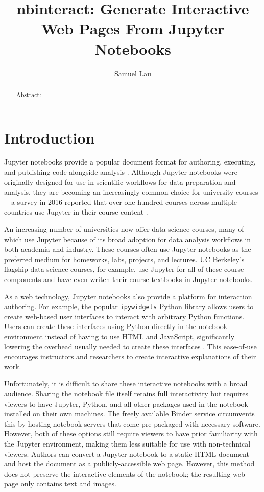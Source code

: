 \documentclass[nobib]{tufte-handout}
\title{nbinteract: Generate Interactive Web Pages From Jupyter Notebooks}
\author[Samuel Lau]{Samuel Lau}
\newcommand{\code}[1]{\texttt{#1}}
\begin{document}
\maketitle%

\begin{abstract}
\noindent
Abstract:
\end{abstract}

\section{Introduction} %
\label{sec:introduction}

Jupyter notebooks provide a popular document format for authoring, executing,
and publishing code alongside analysis \cite{thomas_jupyter_2016}. Although
Jupyter notebooks were originally designed for use in scientific workflows for
data preparation and analysis, they are becoming an increasingly common choice
for university courses---a survey in 2016 reported that over one hundred
courses across multiple countries use Jupyter in their course content
\cite{hamrick_2016_2016}.

An increasing number of universities now offer data science courses, many of
which use Jupyter because of its broad adoption for data analysis workflows in
both academia and industry. These courses often use Jupyter notebooks as the
preferred medium for homeworks, labs, projects, and lectures. UC Berkeley's
flagship data science courses, for example, use Jupyter for all of these course
components and have even writen their course textbooks in Jupyter notebooks.

As a web technology, Jupyter notebooks also provide a platform for interaction
authoring. For example, the popular \code{ipywidgets} Python library allows
users to create web-based user interfaces to interact with arbitrary Python
functions. Users can create these interfaces using Python directly in the
notebook environment instead of having to use HTML and JavaScript,
significantly lowering the overhead usually needed to create these interfaces
\cite{_jupyter-widgets/ipywidgets_}. This ease-of-use encourages instructors
and researchers to create interactive explanations of their work.

Unfortunately, it is difficult to share these interactive notebooks with a
broad audience. Sharing the notebook file itself retains full interactivity but
requires viewers to have Jupyter, Python, and all other packages used in the
notebook installed on their own machines. The freely available Binder service
circumvents this by hosting notebook servers that come pre-packaged with
necessary software. However, both of these options still require viewers to
have prior familiarity with the Jupyter environment, making them less suitable
for use with non-technical viewers. Authors can convert a Jupyter notebook to a
static HTML document and host the document as a publicly-accessible web page.
However, this method does not preserve the interactive elements of the
notebook; the resulting web page only contains text and images.
\end{document}
